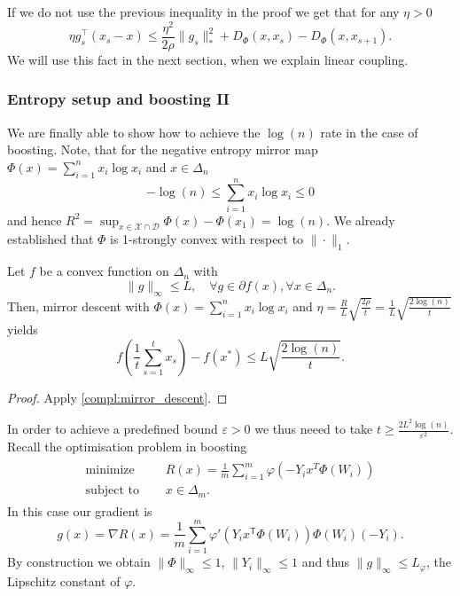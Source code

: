 \begin{remark}\label{mirror_descent_lemma_for_linear_coupling}
    If we do not use the previous inequality in the proof we get that for any $\eta > 0$
    \[
    \eta g_s^\top(x_s - x) \leq \frac{\eta^2}{2\rho} \|g_s\|_\ast^2 + D_\Phi(x, x_s) - D_\Phi(x, x_{s+1}).
    \]
    We will use this fact in the next section, when we explain linear coupling.
\end{remark}

\subsubsection{Entropy setup and boosting II}

We are finally able to show how to achieve the $\log(n)$ rate in the case of boosting. Note, that for the negative entropy mirror map $\Phi(x) = \sum_{i=1}^n x_i \log x_i$ and $x\in \Delta_n$
\begin{equation*}
	 -\log(n) \leq \sum_{i=1}^n x_i \log x_i \leq 0
\end{equation*}
and hence $R^2 = \sup_{x\in \mathcal{X}\cap\mathcal{D}}\Phi(x)-\Phi(x_1) = \log(n)$. We already established that $\Phi$ is 1-strongly convex with respect to $\|\cdot\|_1$.

\begin{corollary}
Let $f$ be a convex function on $\Delta_n$ with 
\begin{equation*}
	\|g\|_\infty \leq L, \quad \forall g \in \partial f(x), \forall x\in \Delta_n.
\end{equation*}
Then, mirror descent with $\Phi(x) = \sum_{i=1}^n x_i \log x_i$ and $\eta =\frac{R}{L}\sqrt{\frac{2\rho}{t}}= \frac{1}{L}\sqrt{\frac{2\log(n)}{t}}$ yields
\begin{equation*}
	f\left(\frac{1}{t}\sum_{s=1}^t x_s \right) - f(x^*) \leq L\sqrt{\frac{2\log(n)}{t}}.
\end{equation*}
\end{corollary}

\begin{proof}
Apply \autoref{compl:mirror_descent}. 
\end{proof}

In order to achieve a predefined bound $\varepsilon > 0$ we thus neeed to take $t \geq \frac{2L^2\log(n)}{\varepsilon^2}$. 
Recall the optimisation problem in boosting
\begin{align*}
	\begin{aligned}
		\text{minimize }\quad   & R(x) = \frac{1}{m} \sum_{i=1}^m \varphi(-Y_ix^T\Phi(W_i))\\
		\text{subject to }\quad & x\in \Delta_m.
	\end{aligned}
\end{align*}
In this case our gradient is
\begin{equation*}
	g(x) = \nabla R(x) = \frac{1}{m}\sum_{i=1}^m \varphi'\left(Y_i x^\mathsf{T}\Phi(W_i)\right)\Phi(W_i)(-Y_i).
\end{equation*}
By construction we obtain $\|\Phi\|_\infty \leq 1$, $\|Y_i\|_\infty\leq 1$ and thus $\|g\|_\infty \leq L_\varphi$, the Lipschitz constant of $\varphi$.
